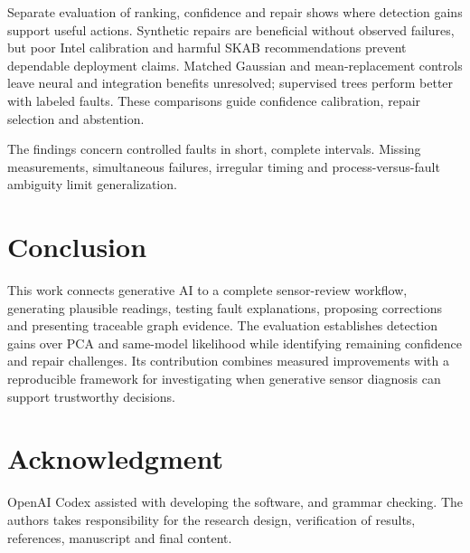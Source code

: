 \documentclass{llncs}
\newcommand{\1}{\mathbf{1}}
\begin{document}
Separate evaluation of ranking, confidence and repair shows where detection gains support useful actions. Synthetic repairs are beneficial without observed failures, but poor Intel calibration and harmful SKAB recommendations prevent dependable deployment claims. Matched Gaussian and mean-replacement controls leave neural and integration benefits unresolved; supervised trees perform better with labeled faults. These comparisons guide confidence calibration, repair selection and abstention.

The findings concern controlled faults in short, complete intervals. Missing measurements, simultaneous failures, irregular timing and process-versus-fault ambiguity limit generalization.






\section{Conclusion}
This work connects generative AI to a complete sensor-review workflow, generating plausible readings, testing fault explanations, proposing corrections and presenting traceable graph evidence. The evaluation establishes detection gains over PCA and same-model likelihood while identifying remaining confidence and repair challenges. Its contribution combines measured improvements with a reproducible framework for investigating when generative sensor diagnosis can support trustworthy decisions.

\section*{Acknowledgment}
OpenAI Codex assisted with developing the software, and grammar checking. The authors takes responsibility for the research design, verification of results, references, manuscript and final content.




\end{document}
